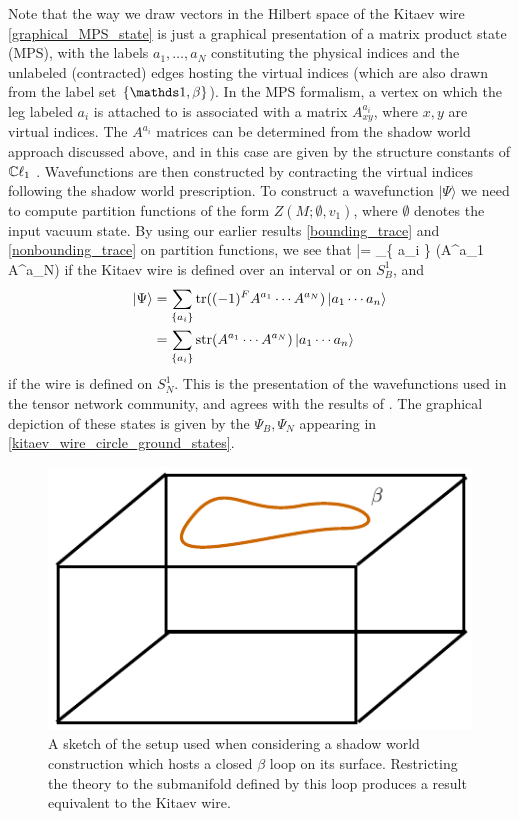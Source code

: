 Note that the way we draw vectors in the Hilbert space of the Kitaev wire \eqref{graphical_MPS_state}
is just a graphical presentation of a matrix product state (MPS), with the labels
$a_1,\dots,a_N$ constituting the physical indices and the unlabeled (contracted) edges hosting the virtual 
indices (which are also drawn from the label set $\{\unit, \beta\}$). 
In the MPS formalism, a vertex on which the leg labeled $a_i$ is attached 
to is associated with a matrix $A^{a_i}_{xy}$, where $x,y$ are virtual indices. 
The $A^{a_i}$ matrices can be determined from the shadow world approach 
discussed above, and in this case are given by the structure constants of $\mathbb{C}\ell_1$ \cite{turzillo2016}. 
Wavefunctions are then constructed by contracting the virtual indices following the 
shadow world prescription. To construct a wavefunction $|\Psi\rangle$ we need to compute 
partition functions of the form $Z(M;\emptyset,v_1)$, where $\emptyset$ denotes 
the input vacuum state. 
By using our earlier results \eqref{bounding_trace} and \eqref{nonbounding_trace} on 
partition functions, we see that 
\be |\Psi\rangle = \sum_{\{ a_i \} }\tr(A^{a_1} \cdots A^{a_N})  \ee
if the Kitaev wire is defined over an interval or on $S^1_B$, and 
\begin{align}
 |\Psi\rangle & = \sum_{\{ a_i \} }\text{tr}((-1)^FA^{a_1} \cdots A^{a_N}) \left|a_1 \cdots a_n\right\rangle \\ 
 & =\sum_{\{ a_i \} }\text{str}(A^{a_1} \cdots A^{a_N}) \left|a_1 \cdots a_n\right\rangle 
 \end{align}
if the wire is defined on $S^1_N$. 
This is the presentation of the wavefunctions used in the tensor network community, 
and agrees with the results of \cite{turzillo2016,bultinck2017b}. 
The graphical depiction of these states is given by the $\Psi_B,\Psi_N$ appearing in \eqref{kitaev_wire_circle_ground_states}. 

\begin{figure}
\centering
\includegraphics{box_beta_loop.pdf}
\caption{ \label{box_beta_loop} A sketch of the setup used when considering a shadow world construction which hosts a closed $\beta$ loop on its surface. Restricting the theory to the submanifold defined by this loop produces a result equivalent to the Kitaev wire. }
\end{figure}

